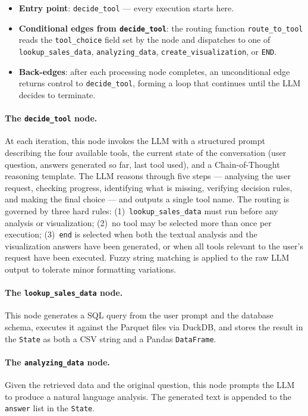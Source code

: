 \begin{itemize}
    \item \textbf{Entry point}: \texttt{decide\_tool} — every execution starts here.
    \item \textbf{Conditional edges from \texttt{decide\_tool}}: the routing function
          \texttt{route\_to\_tool} reads the \texttt{tool\_choice} field set by the node
          and dispatches to one of \texttt{lookup\_sales\_data}, \texttt{analyzing\_data},
          \texttt{create\_visualization}, or \texttt{END}.
    \item \textbf{Back-edges}: after each processing node completes, an unconditional
          edge returns control to \texttt{decide\_tool}, forming a loop that continues
          until the LLM decides to terminate.
\end{itemize}

\paragraph{The \texttt{decide\_tool} node.}
At each iteration, this node invokes the LLM with a structured prompt describing the
four available tools, the current state of the conversation (user question, answers
generated so far, last tool used), and a Chain-of-Thought reasoning template.
The LLM reasons through five steps — analysing the user request, checking progress,
identifying what is missing, verifying decision rules, and making the final choice —
and outputs a single tool name. The routing is governed by three hard rules:
(1)~\texttt{lookup\_sales\_data} must run before any analysis or visualization;
(2)~no tool may be selected more than once per execution;
(3)~\texttt{end} is selected when both the textual analysis and the visualization answers
have been generated, or when all tools relevant to the user's request have been executed.
Fuzzy string matching is applied to the raw LLM output to tolerate minor formatting
variations.

\paragraph{The \texttt{lookup\_sales\_data} node.}
This node generates a SQL query from the user prompt and the database schema, executes
it against the Parquet files via DuckDB, and stores the result in the \texttt{State}
as both a CSV string and a Pandas \texttt{DataFrame}.

\paragraph{The \texttt{analyzing\_data} node.}
Given the retrieved data and the original question, this node prompts the LLM to produce
a natural language analysis. The generated text is appended to the \texttt{answer} list
in the \texttt{State}.

